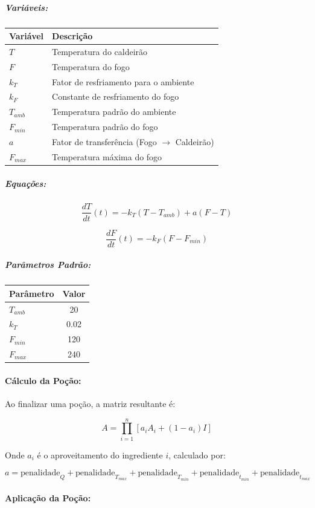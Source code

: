 \documentclass[12pt]{article}
\begin{document}
\subparagraph{Variáveis:}
\begin{tabular}{|l|l|}
\hline
\textbf{Variável} & \textbf{Descrição} \\
\hline
\(T\) & Temperatura do caldeirão \\
\(F\) & Temperatura do fogo \\
\(k_T\) & Fator de resfriamento para o ambiente \\
\(k_F\) & Constante de resfriamento do fogo \\
\(T_{amb}\) & Temperatura padrão do ambiente \\
\(F_{min}\) & Temperatura padrão do fogo \\
\(a\) & Fator de transferência (Fogo $\rightarrow$ Caldeirão) \\
\(F_{max}\) & Temperatura máxima do fogo \\
\hline
\end{tabular}

\subparagraph{Equações:}

\[
\frac{dT}{dt}(t) = -k_T(T - T_{amb}) + a(F - T)
\]

\[
\frac{dF}{dt}(t) = -k_F(F - F_{min})
\]

\subparagraph{Parâmetros Padrão:}

\begin{tabular}{|l|c|}
\hline
\textbf{Parâmetro} & \textbf{Valor} \\
\hline
\(T_{amb}\) & 20 \\
\(k_T\) & 0.02 \\
\(F_{min}\) & 120 \\
\(F_{max}\) & 240 \\
\hline
\end{tabular}

\paragraph{Cálculo da Poção:}

Ao finalizar uma poção, a matriz resultante é:

\[
A = \prod_{i=1}^{n} [a_i A_i + (1-a_i)I]
\]

Onde \(a_i\) é o aproveitamento do ingrediente \(i\), calculado por:

\[
a = \text{penalidade}_Q + \text{penalidade}_{T_{max}} + \text{penalidade}_{T_{min}} + \text{penalidade}_{t_{min}} + \text{penalidade}_{t_{max}}
\]

\paragraph{Aplicação da Poção:}
\end{document}
